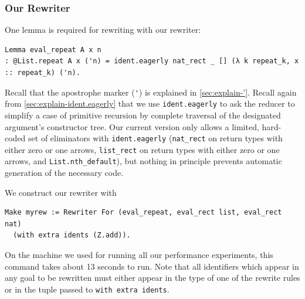 \begin{subappendices}
\subsubsection{Our Rewriter}
One lemma is required for rewriting with our rewriter:
\begin{verbatim}
Lemma eval_repeat A x n
: @List.repeat A x ('n) = ident.eagerly nat_rect _ [] (λ k repeat_k, x :: repeat_k) ('n).
\end{verbatim}
Recall that the apostrophe marker (\verb|'|) is explained in \autoref{sec:explain-'}.
Recall again from \autoref{sec:explain-ident.eagerly} that we use \texttt{ident.eagerly} to ask the reducer to simplify a case of primitive recursion by complete traversal of the designated argument's constructor tree.
Our current version only allows a limited, hard-coded set of eliminators with \texttt{ident.eagerly} (\texttt{nat\_rect} on return types with either zero or one arrows, \texttt{list\_rect} on return types with either zero or one arrows, and \texttt{List.nth\_default}), but nothing in principle prevents automatic generation of the necessary code.

We construct our rewriter with
\begin{verbatim}
Make myrew := Rewriter For (eval_repeat, eval_rect list, eval_rect nat)
  (with extra idents (Z.add)).
\end{verbatim}
On the machine we used for running all our performance experiments, this command takes about 13 seconds to run.
Note that all identifiers which appear in any goal to be rewritten must either appear in the type of one of the rewrite rules or in the tuple passed to \texttt{with extra idents}.


\end{subappendices}
